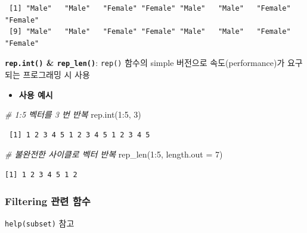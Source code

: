 \documentclass[
  11pt,
]{krantz}
\makeatletter
\newenvironment{Shaded}{\begin{snugshade}}{\end{snugshade}}
\newcommand{\AttributeTok}[1]{\textcolor[rgb]{0.61,0.61,0.61}{#1}}
\newcommand{\CommentTok}[1]{\textcolor[rgb]{0.37,0.37,0.37}{\textit{#1}}}
\newcommand{\DecValTok}[1]{\textcolor[rgb]{0.06,0.06,0.06}{#1}}
\newcommand{\FunctionTok}[1]{\textcolor[rgb]{0,0,0}{#1}}
\newcommand{\NormalTok}[1]{#1}
\newcommand{\SpecialCharTok}[1]{\textcolor[rgb]{0,0,0}{#1}}
\providecommand{\tightlist}{%
  \setlength{\itemsep}{0pt}\setlength{\parskip}{0pt}}
\newenvironment{kframe}{%
\medskip{}
\setlength{\fboxsep}{.8em}
 \def\at@end@of@kframe{}%
 \ifinner\ifhmode%
  \def\at@end@of@kframe{\end{minipage}}%
  \begin{minipage}{\columnwidth}%
 \fi\fi%
 \def\FrameCommand##1{\hskip\@totalleftmargin \hskip-\fboxsep
 \colorbox{shadecolor}{##1}\hskip-\fboxsep
     \hskip-\linewidth \hskip-\@totalleftmargin \hskip\columnwidth}%
 \MakeFramed {\advance\hsize-\width
   \@totalleftmargin\z@ \linewidth\hsize
   \@setminipage}}%
 {\par\unskip\endMakeFramed%
 \at@end@of@kframe}
\renewenvironment{quote}{\begin{kframe}}{\end{kframe}}
\makeatother
\begin{document}
\begin{verbatim}
 [1] "Male"   "Male"   "Female" "Female" "Male"   "Male"   "Female" "Female"
 [9] "Male"   "Male"   "Female" "Female" "Male"   "Male"   "Female" "Female"
\end{verbatim}

\normalsize

\textbf{\texttt{rep.int()} \& \texttt{rep\_len()}}: \texttt{rep()} 함수의 simple 버전으로 속도(performance)가 요구되는 프로그래밍 시 사용

\begin{itemize}
\tightlist
\item
  \textbf{사용 예시}
\end{itemize}

\footnotesize

\begin{Shaded}
\begin{Highlighting}[]
\CommentTok{\# 1:5 벡터를 3 번 반복}
\FunctionTok{rep.int}\NormalTok{(}\DecValTok{1}\SpecialCharTok{:}\DecValTok{5}\NormalTok{, }\DecValTok{3}\NormalTok{)}
\end{Highlighting}
\end{Shaded}

\begin{verbatim}
 [1] 1 2 3 4 5 1 2 3 4 5 1 2 3 4 5
\end{verbatim}

\begin{Shaded}
\begin{Highlighting}[]
\CommentTok{\# 불완전한 사이클로 벡터 반복}
\FunctionTok{rep\_len}\NormalTok{(}\DecValTok{1}\SpecialCharTok{:}\DecValTok{5}\NormalTok{, }\AttributeTok{length.out =} \DecValTok{7}\NormalTok{)}
\end{Highlighting}
\end{Shaded}

\begin{verbatim}
[1] 1 2 3 4 5 1 2
\end{verbatim}

\normalsize

\hypertarget{fun-filtering}{%
\subsubsection*{\texorpdfstring{\textbf{Filtering 관련 함수}}{Filtering 관련 함수}}\label{fun-filtering}}


\begin{quote}
\texttt{help(subset)} 참고
\end{quote}
\end{document}
